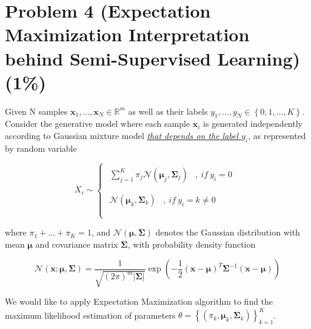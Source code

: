 \documentclass{article}
\def\vecmu{{\boldsymbol \mu}}
\begin{document}
\section*{Problem 4 (Expectation Maximization Interpretation behind Semi-Supervised Learning)(1\%)}

Given N samples
\(\mathbf{x}_{1},\ldots,\mathbf{x}_{N} \in \mathbb{R}^{m}\) as well as
their labels \(y_{1},\ldots,y_{N} \in \left\{ 0,1,\ldots,K \right\}\).
Consider the generative model where each sample \(\mathbf{x}_{i}\) is
generated independently according to Gaussian mixture model
\emph{\uline{that depends on the label \(y_{i}\)}}, as represented by
random variable

\[X_{i}\sim\left\{ \begin{matrix}
\begin{matrix}
\sum_{j=1}^{K}{\pi_{j}\mathcal{N}\left( \vecmu_{j},\mathbf{\Sigma}_{j} \right)} & ,\ if\ y_{i} = 0 \\
\end{matrix} \\
\begin{matrix}
\mathcal{N}\left( \vecmu_{k},\mathbf{\Sigma}_{k} \right) & ,\ if\ y_{i} = k \neq 0 \\
\end{matrix} \\
\end{matrix} \right.\ \]

where \(\pi_{1} + \ldots + \pi_{K} = 1\), and
\(\mathcal{N}\left( \vecmu,\mathbf{\Sigma} \right)\) denotes the
Gaussian distribution with mean \(\vecmu\) and covariance matrix
\(\mathbf{\Sigma}\), with probability density function

\[\mathcal{N}\left( \mathbf{x};\vecmu,\mathbf{\Sigma} \right) = \frac{1}{\sqrt{(2\pi)^{m}\left| \mathbf{\Sigma} \right|}}\exp\left( - \frac{1}{2}\left( \mathbf{x - \vecmu} \right)^{T}\mathbf{\Sigma}^{- 1}\left( \mathbf{x - \vecmu} \right) \right)\]

We would like to apply Expectation Maximization algorithm to find the
maximum likelihood estimation of parameters
\(\theta = \left\{ (\pi_{k},\vecmu_{k},\mathbf{\Sigma}_{k}) \right\}_{k = 1}^{K}\).
\end{document}
